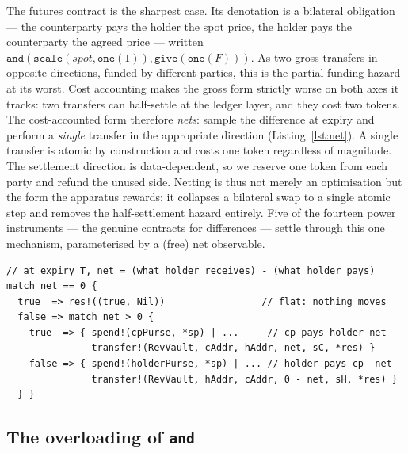 \documentclass[11pt]{article}
\theoremstyle{definition}
\theoremstyle{plain}
\begin{document}
The futures contract is the sharpest case. Its denotation is a bilateral obligation --- the
counterparty pays the holder the spot price, the holder pays the counterparty the agreed price ---
written $\texttt{and}(\texttt{scale}(\mathit{spot},\texttt{one}(1)), \texttt{give}(\texttt{one}(F)))$.
As two gross transfers in opposite directions, funded by different parties, this is the partial-funding
hazard at its worst. Cost accounting makes the gross form strictly worse on both axes it tracks: two
transfers can half-settle at the ledger layer, and they cost two tokens. The cost-accounted form
therefore \emph{nets}: sample the difference at expiry and perform a \emph{single} transfer in the
appropriate direction (Listing~\ref{lst:net}). A single transfer is atomic by construction and costs
one token regardless of magnitude. The settlement direction is data-dependent, so we reserve one token
from each party and refund the unused side. Netting is thus not merely an optimisation but the form
the apparatus rewards: it collapses a bilateral swap to a single atomic step and removes the
half-settlement hazard entirely. Five of the fourteen power instruments --- the genuine contracts for
differences --- settle through this one mechanism, parameterised by a (free) net observable.

\begin{lstlisting}[caption={Netted bilateral settlement: one transfer in the data-dependent direction; atomic by construction.},label={lst:net}]
// at expiry T, net = (what holder receives) - (what holder pays)
match net == 0 {
  true  => res!((true, Nil))                 // flat: nothing moves
  false => match net > 0 {
    true  => { spend!(cpPurse, *sp) | ...     // cp pays holder net
               transfer!(RevVault, cAddr, hAddr, net, sC, *res) }
    false => { spend!(holderPurse, *sp) | ... // holder pays cp -net
               transfer!(RevVault, hAddr, cAddr, 0 - net, sH, *res) }
  } }
\end{lstlisting}

\subsection{The overloading of \texttt{and}}\label{sec:patterns}
\end{document}
